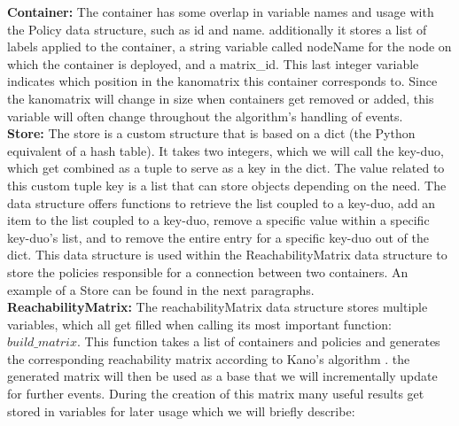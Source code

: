 \textbf{Container:} The container has some overlap in variable names and usage with the Policy data structure, such as id and name. additionally it stores a list of labels applied to the container, a string variable called nodeName for the node on which the container is deployed, and a matrix\_id. This last integer variable indicates which position in the kanomatrix this container corresponds to. Since the kanomatrix will change in size when containers get removed or added, this variable will often change throughout the algorithm's handling of events.
\\[10pt]

\textbf{Store:} The store is a custom structure that is based on a dict (the Python equivalent of a hash table). It takes two integers, which we will call the key-duo, which get combined as a tuple to serve as a key in the dict. The value related to this custom tuple key is a list that can store objects depending on the need. The data structure offers functions to retrieve the list coupled to a key-duo, add an item to the list coupled to a key-duo, remove a specific value within a specific key-duo's list, and to remove the entire entry for a specific key-duo out of the dict. This data structure is used within the ReachabilityMatrix data structure to store the policies responsible for a connection between two containers. An example of a Store can be found in the next paragraphs.
\\[10pt]

\textbf{ReachabilityMatrix:} The reachabilityMatrix data structure stores multiple variables, which all get filled when calling its most important function: $build\_matrix$. This function takes a list of containers and policies and generates the corresponding reachability matrix according to Kano's algorithm \cite{kano}. the generated matrix will then be used as a base that we will incrementally update for further events. During the creation of this matrix many useful results get stored in variables for later usage which we will briefly describe:

